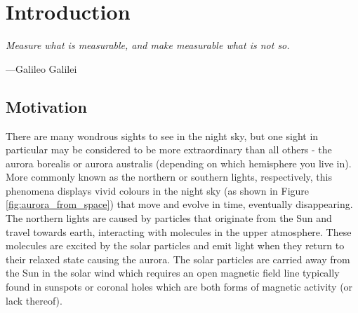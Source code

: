 
\chapter{Introduction} %

\label{Chapter1} %


\newcommand{\keyword}[1]{\textbf{#1}}
\newcommand{\tabhead}[1]{\textbf{#1}}
\newcommand{\code}[1]{\texttt{#1}}
\newcommand{\file}[1]{\texttt{\bfseries#1}}
\newcommand{\option}[1]{\texttt{\itshape#1}}

\newcommand{\ts}{\textsuperscript}
\newcommand{\caII}{Ca II H \& K\xspace}
\newcommand{\Rprime}{$R^{'}_{HK}$\xspace}
\newcommand{\Smw}{$S_{MW}$\xspace}

\newcommand{\esp}{\textit{ESPaDOnS}\xspace}
\newcommand{\narval}{\textit{NARVAL}\xspace}
\newcommand{\Halpha}{H-$\alpha$\xspace}

\newcommand{\Ro}{$R_{0}$\xspace}
\newcommand{\tauc}{$\tau_{c}$\xspace}


\epigraph{\itshape Measure what is measurable, and make measurable what is not so.}{---Galileo Galilei}

\section{Motivation}

There are many wondrous sights to see in the night sky, but one sight in particular may be considered to be more extraordinary than all others - the aurora borealis or aurora australis (depending on which hemisphere you live in). More commonly known as the northern or southern lights, respectively, this phenomena displays vivid colours in the night sky (as shown in Figure \ref{fig:aurora_from_space}) that move and evolve in time, eventually disappearing. The northern lights are caused by particles that originate from the Sun and travel towards earth, interacting with molecules in the upper atmosphere. These molecules are excited by the solar particles and emit light when they return to their relaxed state causing the aurora. The solar particles are carried away from the Sun in the solar wind \citep{Parker_1958} which requires an open magnetic field line typically found in sunspots or coronal holes which are both forms of magnetic activity (or lack thereof).

